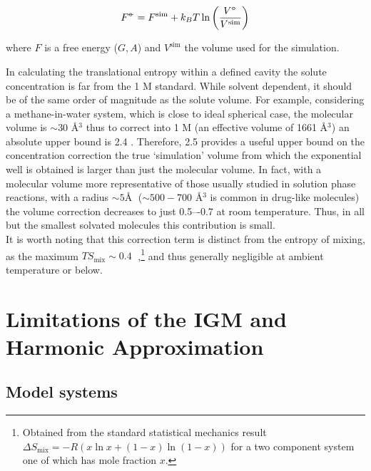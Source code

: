 \documentclass[../main.tex]{subfiles}
\begin{document}
\begin{equation}
	F^{{\circ\kern-0.495em-}} = F^\text{sim} + k_BT \ln\left(\frac{V^{\circ\kern-0.495em-}}{V^\text{sim}}\right)
\end{equation}

where $F$ is a free energy ($G, A$) and $V^\text{sim}$ the volume used for the simulation. 

In calculating the translational entropy within a defined cavity the solute concentration is far from the 1 M standard. While solvent dependent, it should be of the same order of magnitude as the solute volume. For example, considering a methane-in-water system, which is close to ideal spherical case, the molecular volume is $\sim 30$ \AA$^3$\cite{Zhao2003} thus to correct into 1 M (an effective volume of 1661 \AA$^3$) an absolute upper bound is 2.4 \kcal. 
Therefore, 2.5 \kcalx provides a useful upper bound on the concentration correction the true `simulation' volume from which the exponential well is obtained is larger than just the molecular volume. In fact, with a molecular volume more representative of those usually studied in solution phase reactions, with a radius $\sim 5 $\AA$\;$  ($\sim 500-700$ \AA$^3$ is common in drug-like molecules\cite{Khanna2009}) the volume correction decreases to just 0.5–-0.7 \kcalx at room temperature. Thus, in all but the smallest solvated molecules this contribution is small.
\\
It is worth noting that this correction term is distinct from the entropy of mixing, as the maximum $TS_\text{mix} \sim 0.4\;$ \kcal,\footnote{Obtained from the standard statistical mechanics result $\Delta S_\text{mix} = -R(x \ln x + (1-x)\ln(1 - x))$ for a two component system one of which has mole fraction $x$.}  and thus generally negligible at ambient temperature or below.


\section{Limitations of the IGM and Harmonic Approximation}
\subsection{Model systems}
\end{document}
